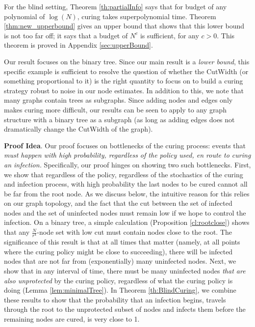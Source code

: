 For the blind setting, Theorem \ref{th:partialInfo} says that for budget of any polynomial of $\log(N)$, curing takes superpolynomial time. Theorem \ref{thm:new_upperbound} gives an upper bound that shows that this lower bound is not too far off; it says that a budget of $N^c$ is sufficient, for any $c > 0$. This theorem is proved in Appendix \ref{sec:upperBound}.

Our result focuses on the binary tree. Since our main result is a {\em lower bound}, this specific example is sufficient to resolve the question of whether the {\sc CutWidth} (or something proportional to it) is the right quantity to focus on to build a curing strategy robust to noise in our node estimates. In addition to this, we note that many graphs contain trees as subgraphs. Since adding nodes and edges only makes curing more difficult, our results can be seen to apply to any graph structure with a binary tree as a subgraph (as long as adding edges does not dramatically change the {\sc CutWidth} of the graph).
%	

{\bf Proof Idea}. Our proof focuses on bottlenecks of the curing process: events that {\em must happen with high probability, regardless of the policy used, en route to curing an infection.} Specifically, our proof hinges on showing two such bottlenecks. First, we show that regardless of the policy, regardless of the stochastics of the curing and infection process, with high probability the last nodes to be cured cannot all be far from the root node. As we discuss below, the intuitive reason for this relies on our graph topology, and the fact that the cut between the set of infected nodes and the set of uninfected nodes must remain low if we hope to control the infection. On a binary tree, a simple calculation (Proposition \ref{cl:rootclose}) shows that any $\frac{N}{r^4}$-node set with low cut must contain nodes close to the root. The significance of this result is that at all times that matter (namely, at all points where the curing policy might be close to succeeding), there will be infected nodes that are not far from (exponentially) many uninfected nodes. Next, we show that in any interval of time, there must be many uninfected nodes {\em that are also unprotected} by the curing policy, regardless of what the curing policy is doing (Lemma \ref{lem:minimalTree}). In Theorem \ref{th:BlindCuring}, we combine these results to show that the probability that an infection begins, travels through the root to the unprotected subset of nodes and infects them before the remaining nodes are cured, is very close to 1.



